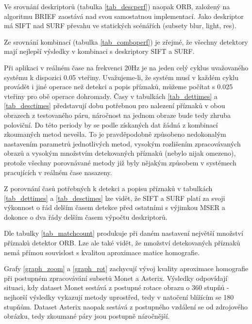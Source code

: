 Ve srovnání deskriptorů (tabulka \ref{tab_descperf}) naopak ORB, založený na algoritmu BRIEF zaostává nad svou samostatnou implementací.
Jako deskriptor má SIFT nad SURF převahu ve statických scénářích (subsety blur, light, res).

Ze srovnání kombinací (tabulka \ref{tab_comboperf}) je zřejmé, že všechny detektory mají nejlepší výsledky v kombinaci s deskriptory SIFT a SURF.

Při aplikaci v reálném čase na frekvenci 20Hz je na jeden celý cyklus uvažovaného systému k dispozici 0.05 vteřiny. Uvažujeme-li, že systém musí v každém cyklu provádět i jiné operace než detekci a popis příznaků, můžeme počítat s 0.025 vteřiny pro obě operace dohromady. Časy v tabulkách \ref{tab_dettimes} a \ref{tab_desctimes} představují dobu potřebnou pro nalezení příznaků v obou obrazech z testovaného páru, náročnost na jednom obraze bude tedy zhruba poloviční. Do této periody by se podle získaných dat žádná z kombinací zkoumaných metod nevešla. To je pravděpodobně způsobeno nedokonalým nastavením parametrů jednotlivých metod, vysokým rozlišením zpracovávaných obrazů a vysokým množstvím detekovaných příznaků (nebylo nijak omezeno), protože všechny porovnávané metody již byly nějakým způsobem v systémech pracujících v reálném čase nasazeny.

Z porovnání časů potřebných k detekci a popisu příznaků v tabulkách \ref{tab_dettimes} a \ref{tab_desctimes} lze vidět, že SIFT a SURF platí za svoji
výkonnost o řád delším časem detekce před ostatními s výjimkou MSER a dokonce o dva řády delším časem výpočtu deskriptorů.

Dle tabulky \ref{tab_matchcount} produkuje při daném nastavení největší množství příznaků detektor ORB. Lze ale také vidět, že množství
detekovaných příznaků nemá přímou souvislost s kvalitou aproximace matice homografie.

Grafy \ref{graph_zoom} a \ref{graph_rot} zachycují vývoj kvality aproximace homografie při postupném zpracovávání subsetů Monet a Asterix.
Výsledky odpovídají situaci, kdy dataset Monet sestává z postupné rotace obrazu o 360 stupňů - nejhorší výsledky vykazují metody uprostřed, tedy
v natočení blížícím se 180 stupňům. Dataset Asterix naopak sestává z postupného vzdálení se od zdrojového obrázku, tedy zkoumané páry jsou postupně
náročnější.



